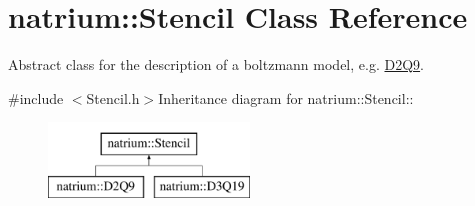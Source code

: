 \hypertarget{classnatrium_1_1Stencil}{
\section{natrium::Stencil Class Reference}
\label{classnatrium_1_1Stencil}
}


Abstract class for the description of a boltzmann model, e.g. \hyperlink{classnatrium_1_1D2Q9}{D2Q9}.  


{\ttfamily \#include $<$Stencil.h$>$}Inheritance diagram for natrium::Stencil::\begin{figure}[H]
\begin{center}
\leavevmode
\includegraphics[height=2cm]{classnatrium_1_1Stencil}
\end{center}
\end{figure}
